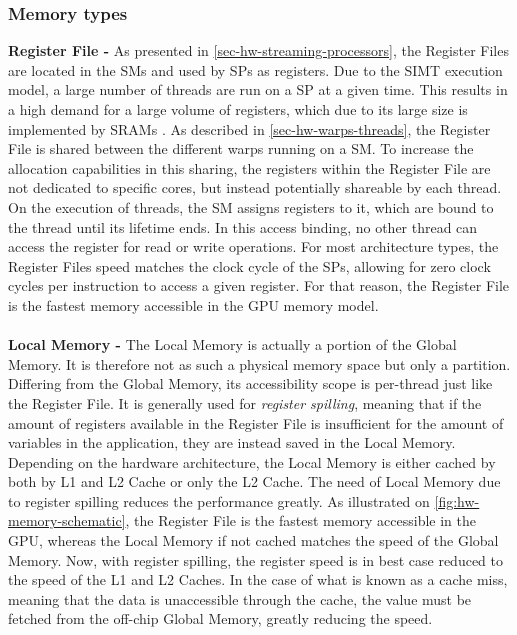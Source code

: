 \subsubsection{Memory types}
\label{sec-mem-types}
\textbf{Register File -} As presented in \cref{sec-hw-streaming-processors}, the Register Files are located in the SMs and used by SPs as registers.
Due to the SIMT execution model, a large number of threads are run on a SP at a given time.
This results in a high demand for a large volume of registers, which due to its large size is implemented by SRAMs \cite{Li2016}.
As described in \cref{sec-hw-warps-threads}, the Register File is shared between the different warps running on a SM.
To increase the allocation capabilities in this sharing, the registers within the Register File are not dedicated to specific cores, but instead potentially shareable by each thread.
On the execution of threads, the SM assigns registers to it, which are bound to the thread until its lifetime ends.
In this access binding, no other thread can access the register for read or write operations.
For most architecture types, the Register Files speed matches the clock cycle of the SPs, allowing for zero clock cycles per instruction to access a given register.
For that reason, the Register File is the fastest memory accessible in the GPU memory model.
\\\\
\textbf{Local Memory -} The Local Memory is actually a portion of the Global Memory.
It is therefore not as such a physical memory space but only a partition.
Differing from the Global Memory, its accessibility scope is per-thread just like the Register File.
It is generally used for \textit{register spilling}, meaning that if the amount of registers available in the Register File is insufficient for the amount of variables in the application, they are instead saved in the Local Memory.
Depending on the hardware architecture, the Local Memory is either cached by both by L1 and L2 Cache or only the L2 Cache.
The need of Local Memory due to register spilling reduces the performance greatly.
As illustrated on \cref{fig:hw-memory-schematic}, the Register File is the fastest memory accessible in the GPU, whereas the Local Memory if not cached matches the speed of the Global Memory. 
Now, with register spilling, the register speed is in best case reduced to the speed of the L1 and L2 Caches.
In the case of what is known as a cache miss, meaning that the data is unaccessible through the cache, the value must be fetched from the off-chip Global Memory, greatly reducing the speed.
